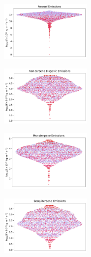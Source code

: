 \begin{figure}[H]
    \centering
    \begin{subfigure}
        \centering
        \includegraphics[width=0.49\textwidth,valign=t]{sosaa-data/figures/trajectories/trajectory-21.05.2018:15.00-aerosols.pdf}
    \end{subfigure}
    \begin{subfigure}
        \centering
        \includegraphics[width=0.49\textwidth,valign=t]{sosaa-data/figures/trajectories/trajectory-21.05.2018:15.00-biogenic.pdf}
    \end{subfigure}
    
    \begin{subfigure}
        \centering
        \includegraphics[width=0.49\textwidth,valign=t]{sosaa-data/figures/trajectories/trajectory-21.05.2018:15.00-monoterpenes.pdf}
    \end{subfigure}
    \begin{subfigure}
        \centering
        \includegraphics[width=0.49\textwidth,valign=t]{sosaa-data/figures/trajectories/trajectory-21.05.2018:15.00-sesquiterpenes.pdf}
    \end{subfigure}


\end{figure}
